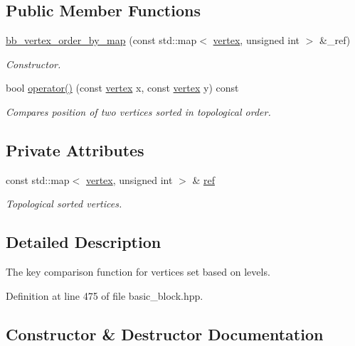 \subsection*{Public Member Functions}
\begin{DoxyCompactItemize}
\item 
\hyperlink{classbb__vertex__order__by__map_a5879775f84c2de3aa09dc2cd0f81c08f}{bb\+\_\+vertex\+\_\+order\+\_\+by\+\_\+map} (const std\+::map$<$ \hyperlink{graph_8hpp_abefdcf0544e601805af44eca032cca14}{vertex}, unsigned int $>$ \&\+\_\+ref)
\begin{DoxyCompactList}\small\item\em Constructor. \end{DoxyCompactList}\item 
bool \hyperlink{classbb__vertex__order__by__map_a03f22e5a78bd9812aec0bcf74325ee8a}{operator()} (const \hyperlink{graph_8hpp_abefdcf0544e601805af44eca032cca14}{vertex} x, const \hyperlink{graph_8hpp_abefdcf0544e601805af44eca032cca14}{vertex} y) const
\begin{DoxyCompactList}\small\item\em Compares position of two vertices sorted in topological order. \end{DoxyCompactList}\end{DoxyCompactItemize}
\subsection*{Private Attributes}
\begin{DoxyCompactItemize}
\item 
const std\+::map$<$ \hyperlink{graph_8hpp_abefdcf0544e601805af44eca032cca14}{vertex}, unsigned int $>$ \& \hyperlink{classbb__vertex__order__by__map_ab98cf3dde2ae8273492cf4ca9a37b13f}{ref}
\begin{DoxyCompactList}\small\item\em Topological sorted vertices. \end{DoxyCompactList}\end{DoxyCompactItemize}


\subsection{Detailed Description}
The key comparison function for vertices set based on levels. 

Definition at line 475 of file basic\+\_\+block.\+hpp.



\subsection{Constructor \& Destructor Documentation}
\mbox{\label{classbb__vertex__order__by__map_a5879775f84c2de3aa09dc2cd0f81c08f}} 
